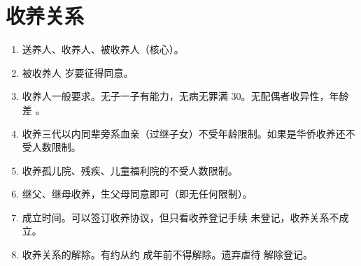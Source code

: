 \section{收养关系}
\begin{enumerate}
  \item 送养人、收养人、被收养人（核心）。
  \item 被收养人  岁要征得同意。
  \item 收养人一般要求。无子一子有能力，无病无罪满 30。无配偶者收异性，年龄差 。
  \item 收养三代以内同辈旁系血亲（过继子女）不受年龄限制。如果是华侨收养还不受人数限制。
  \item 收养孤儿院、残疾、儿童福利院的不受人数限制。
  \item 继父、继母收养，生父母同意即可（即无任何限制）。
  \item 成立时间。可以签订收养协议，但只看收养登记手续 \yjt 未登记，收养关系不成立。
  \item 收养关系的解除。有约从约 \yjt 成年前不得解除。遗弃虐待 \yjt 解除登记。
\end{enumerate}
